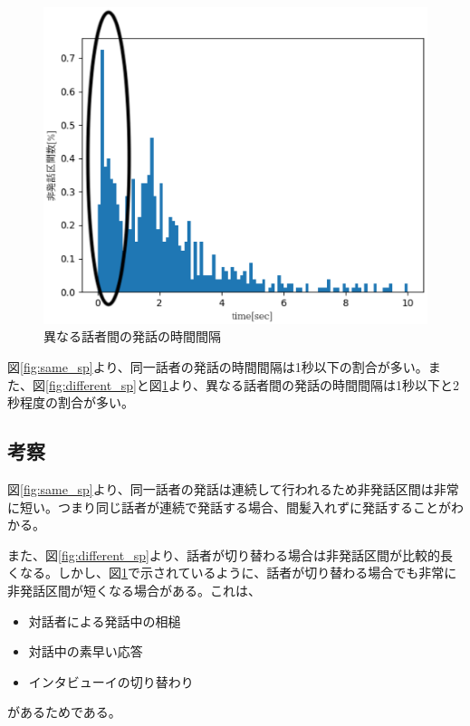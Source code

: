 \begin{figure}[H]
  \begin{center}
    \includegraphics{./figure/pre_other1.eps}
  \end{center}
  \caption{異なる話者間の発話の時間間隔 \label{fig:different_sp2}}
\end{figure}

図\ref{fig:same_sp}より、同一話者の発話の時間間隔は1秒以下の割合が多い。また、図\ref{fig:different_sp}と図\ref{fig:different_sp2}より、異なる話者間の発話の時間間隔は1秒以下と2秒程度の割合が多い。

\subsection{考察}
図\ref{fig:same_sp}より、同一話者の発話は連続して行われるため非発話区間は非常に短い。つまり同じ話者が連続で発話する場合、間髪入れずに発話することがわかる。\par
また、図\ref{fig:different_sp}より、話者が切り替わる場合は非発話区間が比較的長くなる。しかし、図\ref{fig:different_sp2}で示されているように、話者が切り替わる場合でも非常に非発話区間が短くなる場合がある。これは、

\begin{itemize}
\item 対話者による発話中の相槌
\item 対話中の素早い応答
\item インタビューイの切り替わり
\end{itemize}

があるためである。
